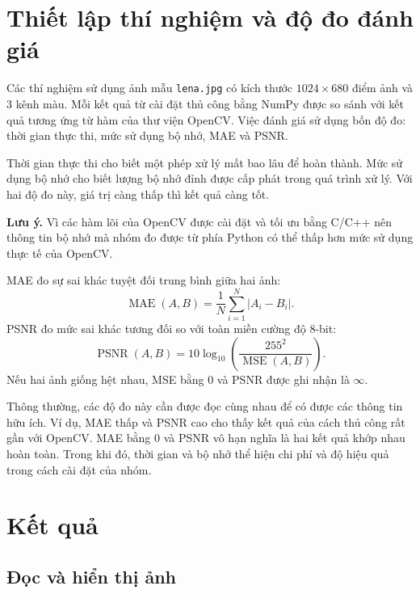 \documentclass[12pt]{article}
\newcommand{\infpsnr}{$\infty$}
\numberwithin{equation}{section}
\begin{document}
\section{Thiết lập thí nghiệm và độ đo đánh giá}

Các thí nghiệm sử dụng ảnh mẫu \texttt{lena.jpg} có kích thước
$1024 \times 680$ điểm ảnh và 3 kênh màu. Mỗi kết quả từ cài đặt thủ công bằng NumPy được so
sánh với kết quả tương ứng từ hàm của thư viện OpenCV. Việc đánh giá sử dụng bốn độ đo: thời gian
thực thi, mức sử dụng bộ nhớ, MAE và PSNR.

Thời gian thực thi cho biết một phép xử lý mất bao lâu để hoàn thành. Mức sử
dụng bộ nhớ cho biết lượng bộ nhớ đỉnh được cấp phát trong quá trình xử lý. Với
hai độ đo này, giá trị càng thấp thì kết quả càng tốt.

\textbf{Lưu ý.} Vì các hàm lõi của OpenCV được cài đặt và tối ưu bằng C/C++ nên thông tin bộ nhớ mà nhóm đo được từ phía Python có thể thấp hơn mức sử dụng thực tế của OpenCV.

MAE đo sự sai khác tuyệt đối trung bình giữa hai ảnh:
\begin{equation}
\operatorname{MAE}(A,B)=\frac{1}{N}\sum_{i=1}^{N}|A_i-B_i|.
\label{eq:mae}
\end{equation}
PSNR đo mức sai khác tương đối so với toàn miền cường độ 8-bit:
\begin{equation}
\operatorname{PSNR}(A,B)=10\log_{10}\left(\frac{255^2}{\operatorname{MSE}(A,B)}\right).
\label{eq:psnr}
\end{equation}
Nếu hai ảnh giống hệt nhau, MSE bằng 0 và PSNR được ghi nhận là \infpsnr.

Thông thường, các độ đo này cần được đọc cùng nhau để có được các thông tin hữu ích. Ví dụ, MAE thấp và PSNR cao cho thấy kết quả của cách thủ
công rất gần với OpenCV. MAE bằng 0 và PSNR vô hạn nghĩa là hai kết quả khớp nhau hoàn toàn. Trong khi đó, thời gian và bộ nhớ thể hiện chi phí và độ hiệu quả trong cách cài đặt của nhóm.

\section{Kết quả}

\subsection{Đọc và hiển thị ảnh}
\end{document}
